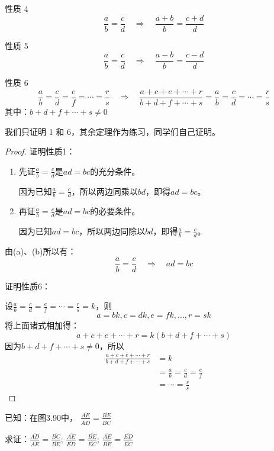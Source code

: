 \begin{Theorem}[合比定理]{性质 4}
    \[\frac{a}{b}=\frac{c}{d}\quad \Rightarrow\quad \frac{a+b}{b}=\frac{c+d}{d}\] 
\end{Theorem}

\begin{Theorem}[分比定理]{性质 5}
    \[\frac{a}{b}=\frac{c}{d}\quad \Rightarrow\quad \frac{a-b}{b}=\frac{c-d}{d}\] 
\end{Theorem}

\begin{Theorem}[等比定理]{性质 6}
    \[\frac{a}{b}=\frac{c}{d}=\frac{e}{f}=\cdots=\frac{r}{s}\quad \Rightarrow\quad \frac{a+c+e+\cdots+r}{b+d+f+\cdots+s}=\frac{a}{b}=\frac{c}{d}=\cdots=\frac{r}{s}\] 
其中：$b+d+f+\cdots+s\ne 0$
\end{Theorem}

我们只证明 1 和 6，其余定理作为练习，同学们自己证明。

\begin{proof}
证明性质1：
\begin{enumerate}
    \item 先证$\frac{a}{b}=\frac{c}{d}$是$ad=bc$的充分条件。

    因为已知$\frac{a}{b}=\frac{c}{d}$，所以两边同乘以$bd$，即得$ad=bc$。
\item     再证$\frac{a}{b}=\frac{c}{d}$是$ad=bc$的必要条件。

因为已知$ad=bc$，所以两边同除以$bd$，即得$\frac{a}{b}=\frac{c}{d}$。
\end{enumerate}

由(a)、(b)所以有：
\[\frac{a}{b}=\frac{c}{d}\quad \Rightarrow\quad ad=bc\]    

证明性质6：

设$\frac{a}{b}=\frac{c}{d}=\frac{e}{f}=\cdots=\frac{r}{s}=k$，则
\[a=bk, c=dk, e=fk, \ldots, r=sk\] 
将上面诸式相加得：
\[a+c+e+\cdots+r=k(b+d+f+\cdots+s)\]
因为$b+d+f+\cdots+s\ne 0$，所以
\[\begin{split}
    \frac{a+c+e+\cdots+r}{b+d+f+\cdots+s}&=k\\
    &=\frac{a}{b}=\frac{c}{d}=\frac{e}{f}\\
    &=\cdots=\frac{r}{s}
\end{split}
    \]
\end{proof}


\begin{example}
    已知：在图3.90中，
$\frac{\overline{AE}}{\overline{AD}}=\frac{\overline{BE}}{\overline{BC}}$

求证：$\frac{\overline{AD}}{\overline{AE}}=\frac{\overline{BC}}{\overline{BE}}$; $\frac{\overline{AE}}{\overline{ED}}=\frac{\overline{BE}}{\overline{EC}}$; $\frac{\overline{AE}}{\overline{BE}}=\frac{\overline{ED}}{\overline{EC}}$
\end{example}

